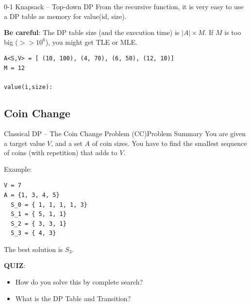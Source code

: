 \begin{frame}[fragile]{0-1 Knapsack -- Top-down DP}
  From the recursive function, it is very easy to use a DP table as memory for value(id, size).\medskip

    {\bf Be careful}: The DP table size (and the execution time) is $|A|\times M$. If $M$ is too big ($>> 10^6$), you might get TLE or MLE.
\begin{verbatim}
A<S,V> = [ (10, 100), (4, 70), (6, 50), (12, 10)]
M = 12

value(i,size):
\end{verbatim}

  \begin{center}
  \bigskip
  \end{center}


\end{frame}

\subsection{Coin Change}
\begin{frame}[fragile]{Classical DP -- The Coin Change Problem (CC)}{Problem Summary}
  You are given a target value $V$, and a set $A$ of coin sizes. You have to find the smallest sequence of coins (with repetition) that adds to $V$.
  \bigskip

Example:
\begin{verbatim}
V = 7
A = {1, 3, 4, 5}
  S_0 = { 1, 1, 1, 1, 3}
  S_1 = { 5, 1, 1}
  S_2 = { 3, 3, 1}
  S_3 = { 4, 3}
\end{verbatim}

The best solution is $S_3$.\bigskip

{\bf QUIZ}:
\begin{itemize}
  \item How do you solve this by complete search?
  \item What is the DP Table and Transition?
\end{itemize}
\end{frame}

